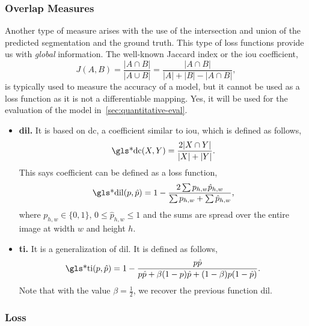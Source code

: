 \subsubsection{Overlap Measures}

Another type of measure arises with the use of the intersection and union of
the predicted segmentation and the ground truth. This type of loss functions
provide us with \emph{global} information. The well-known Jaccard
index or the \gls{iou} coefficient,
\begin{equation}
  J(A,B) = \frac{|A \cap B|}{|A \cup B|} =
  \frac{|A \cap B|}{|A| + |B| - |A \cap B|},
\end{equation}
is typically used to measure the accuracy of a model, but it cannot be used as
a loss function as it is not a differentiable mapping. Yes, it will be used for
the evaluation of the model in\ \vref{sec:quantitative-eval}.

\begin{itemize}
  \item \textbf{\gls{dil}.} It is based on \gls{dc}, a coefficient similar to
  \gls{iou}, which is defined as follows,
  \begin{equation}
    \text{\gls*{dc}}(X, Y) = \frac{2|X \cap Y|}{|X| + |Y|}.
  \end{equation}
  This says coefficient can be defined as a loss function,
  \begin{equation}
    \text{\gls*{dil}}(p, \hat{p}) = 1 -
    \frac{2\sum p_{h, w}\hat{p}_{h, w}}{\sum p_{h, w} + \sum \hat{p}_{h, w}},
  \end{equation}
  where \(p_{h, w} \in \{0, 1\}\), \(0 \leq \hat{p}_{h, w} \leq 1\) and the
  sums are spread over the entire image at width \(w\) and height \(h\).
  \item \textbf{\gls{ti}.} It is a generalization of \gls{dil}. It is defined
  as follows,
  \begin{equation}
    \text{\gls*{ti}}(p, \hat{p}) = 1 -
    \frac{p\hat{p}}{p\hat{p} + \beta(1 - p)\hat{p} + (1 - \beta)p(1 - \hat{p})}.
  \end{equation}
  Note that with the value \(\beta = \frac{1}{2}\), we recover the previous
  function \gls{dil}.
\end{itemize}

\subsubsection{ Loss}

